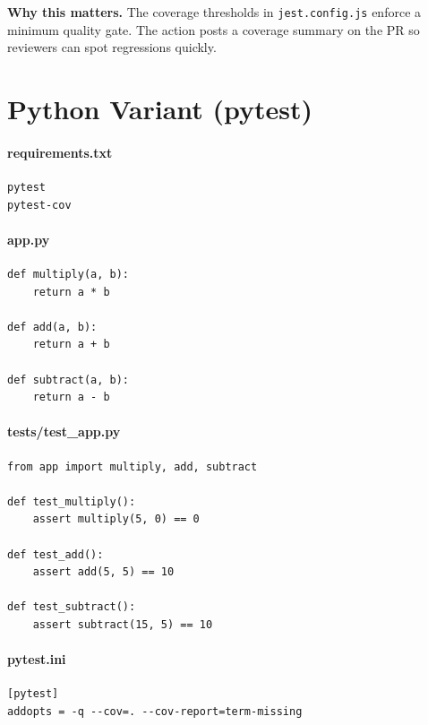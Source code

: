 \documentclass[11pt]{article}
\begin{document}
\begin{tcolorbox}
\textbf{Why this matters.} The coverage thresholds in \texttt{jest.config.js} enforce a minimum quality gate. The action posts a coverage summary on the PR so reviewers can spot regressions quickly.
\end{tcolorbox}

\section{Python Variant (pytest)}
\paragraph{requirements.txt}
\begin{verbatim}
pytest
pytest-cov
\end{verbatim}

\paragraph{app.py}
\begin{verbatim}
def multiply(a, b):
    return a * b

def add(a, b):
    return a + b

def subtract(a, b):
    return a - b
\end{verbatim}

\paragraph{tests/test\_app.py}
\begin{verbatim}
from app import multiply, add, subtract

def test_multiply():
    assert multiply(5, 0) == 0

def test_add():
    assert add(5, 5) == 10

def test_subtract():
    assert subtract(15, 5) == 10
\end{verbatim}

\paragraph{pytest.ini}
\begin{verbatim}
[pytest]
addopts = -q --cov=. --cov-report=term-missing
\end{verbatim}
\clearpage
\end{document}
